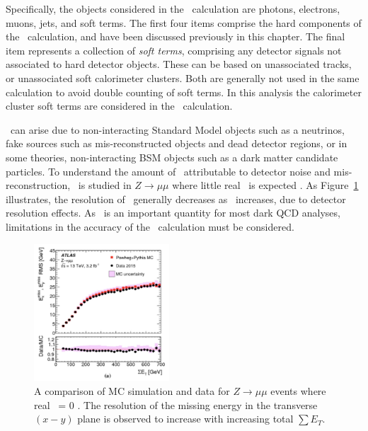 Specifically, the objects considered in the \met~calculation are photons, electrons, muons, jets, and soft terms. The first four items comprise the hard components of the \met~calculation, and have been discussed previously in this chapter. The final item represents a collection of \textit{soft terms}, comprising any detector signals not associated to hard detector objects. These can be based on unassociated tracks, or unassociated soft calorimeter clusters. Both are generally not used in the same calculation to avoid double counting of soft terms. In this analysis the calorimeter cluster soft terms are considered in the \met~calculation. \par

\met~can arise due to non-interacting Standard Model objects such as a neutrinos, fake sources such as mis-reconstructed objects and dead detector regions, or in some theories, non-interacting BSM objects such as a dark matter candidate particles. To understand the amount of \met~attributable to detector noise and mis-reconstruction, \met~is studied in $Z\rightarrow \mu\mu$ where little real \met~is expected \cite{met_res}. As Figure~\ref{fig:met_res} illustrates, the resolution of \met~generally decreases as \met~increases, due to detector resolution effects. As \met~is an important quantity for most dark QCD analyses, limitations in the accuracy of the \met~calculation must be considered.

\begin{figure}[h]
        \centering
	\includegraphics[width=0.45\textwidth]{figures/ch5/met_res}
	\caption{ A comparison of MC simulation and data for $Z\rightarrow\mu\mu$ events where real \met~= 0 \cite{met_res}. The resolution of the missing energy in the transverse $(x-y)$ plane is observed to increase with increasing total $\sum E_T$. }
	\label{fig:met_res}
\end{figure}
